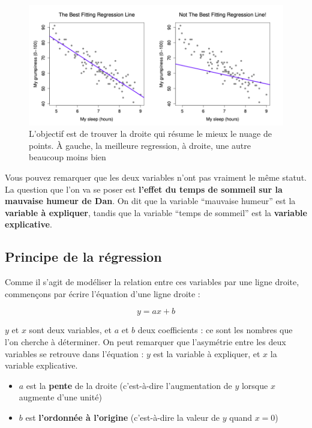 \documentclass[
]{book}
\providecommand{\tightlist}{%
  \setlength{\itemsep}{0pt}\setlength{\parskip}{0pt}}
\begin{document}
\begin{figure}
\centering
\includegraphics{images/regressionline.png}
\caption{L'objectif est de trouver la droite qui résume le mieux le nuage de
points. À gauche, la meilleure regression, à droite, une autre beaucoup
moins bien}
\end{figure}

Vous pouvez remarquer que les deux variables n'ont pas vraiment le même
statut. La question que l'on va se poser est \textbf{l'effet du temps de sommeil sur la mauvaise humeur de Dan}. On dit que la variable ``mauvaise humeur''
est la \textbf{variable à expliquer}, tandis que la variable ``temps de sommeil''
est la \textbf{variable explicative}.

\hypertarget{principe-de-la-ruxe9gression}{%
\subsection{Principe de la régression}\label{principe-de-la-ruxe9gression}}

Comme il s'agit de modéliser la relation entre ces variables par une ligne droite, commençons par écrire l'équation d'une ligne droite :

\[ y = ax + b \]

\(y\) et \(x\) sont deux variables, et \(a\) et \(b\) deux coefficients : ce sont les nombres que l'on cherche à déterminer. On peut remarquer que l'asymétrie entre les deux variables se retrouve dans l'équation : \(y\) est la variable à expliquer, et \(x\) la variable explicative.

\begin{itemize}
\tightlist
\item
  \(a\) est la \textbf{pente} de la droite (c'est-à-dire l'augmentation de
  \(y\) lorsque \(x\) augmente d'une unité)
\item
  \(b\) est \textbf{l'ordonnée à l'origine} (c'est-à-dire la valeur de \(y\)
  quand \(x = 0\))
\end{itemize}
\end{document}

